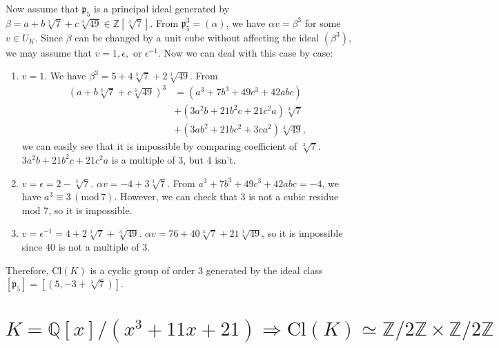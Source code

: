 \documentclass{article}
\newcommand{\Cl}{\mathrm{Cl}}
\newcommand{\Mod}[1]{\,(\mathrm{mod}\,#1)}
\begin{document}
Now assume that $\mathfrak{p}_{5}$ is a principal ideal generated by $\beta= a+b\sqrt[3]{7} + c\sqrt[3]{49}\in \mathbb{Z}[\sqrt[3]{7}]$. 
From $\mathfrak{p}_{5}^{3} =(\alpha)$, we have $\alpha v = \beta^{3}$ for some $v\in U_{K}$. Since $\beta$ can be changed by a unit cube without affecting the ideal $(\beta^{3})$, we may assume  that $v = 1, \epsilon,$ or $\epsilon^{-1}$. Now we can deal with this case by case:
\begin{enumerate}
\item $v = 1$. We have $\beta^{3} = 5 + 4\sqrt[3]{7} + 2\sqrt[3]{49}$. From 
\begin{align*}
(a+b\sqrt[3]{7}+c\sqrt[3]{49})^{3} &=(a^{3} + 7b^{3} + 49c^{3} + 42abc) \\
&+ (3a^{2}b + 21b^{2}c + 21c^{2}a)\sqrt[3]{7} \\
&+ (3ab^{2} + 21bc^{2} + 3ca^{2})\sqrt[3]{49},
\end{align*}
we can easily see that it is impossible by comparing coefficient of $\sqrt[3]{7}$. $3a^{2}b + 21b^{2}c + 21c^{2} a$ is a multiple of 3, but 4 isn't. 
\item $v = \epsilon=2-\sqrt[3]{7}$. $\alpha v = -4 + 3\sqrt[3]{7}$. From $a^{3} + 7b^{3} + 49c^{3} + 42abc = -4$, we have $a^{3}\equiv 3\Mod{7}$. However, we can check that 3 is not a cubic residue mod 7, so it is impossible. 
\item $v = \epsilon^{-1} = 4 + 2\sqrt[3]{7} + \sqrt[3]{49}$. $\alpha v = 76 + 40\sqrt[3]{7} + 21\sqrt[3]{49}$, so it is impossible since 40 is not a multiple of 3. 
\end{enumerate}
Therefore, $\Cl(K)$ is a cyclic group of order 3 generated by the ideal class $[\mathfrak{p}_{5}] = [(5, -3 + \sqrt[3]{7})]$. 




\section{$K =\mathbb{Q}[x]/(x^{3} + 11x + 21)\Rightarrow \Cl(K) \simeq \mathbb{Z}/2\mathbb{Z}\times \mathbb{Z}/2\mathbb{Z}$}
\end{document}
